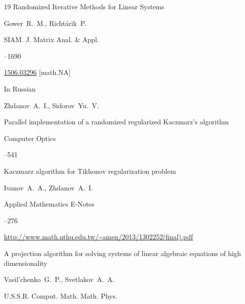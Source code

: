 \begin{thebibliography}{19}
\paper Randomized Iterative Methods for Linear Systems

\by Gower~R.~M., Richt\'arik~P.

\jour SIAM. J. Matrix Anal. \& Appl.




–1690

\arxiv \href{https://arxiv.org/abs/1506.03296}{1506.03296} [math.NA]




\lang In Russian

\by Zhdanov~A.~I., Sidorov~Yu.~V.

\paper Parallel implementation of a randomized regularized Kaczmarz's algorithm

\jour      Computer Optics




--541





\paper Kaczmarz algorithm for Tikhonov regularization problem

\by Ivanov~A.~A., Zhdanov~A.~I.

\jour Applied Mathematics E-Notes 



--276

\elink \url{http://www.math.nthu.edu.tw/~amen/2013/1302252(final).pdf}






\paper A projection algorithm for solving systems of linear algebraic equations of high dimensionality

\by Vasil'chenko~G.~P., Svetlakov~A.~A.

\jour U.S.S.R. Comput. Math. Math. Phys.




\end{thebibliography}
